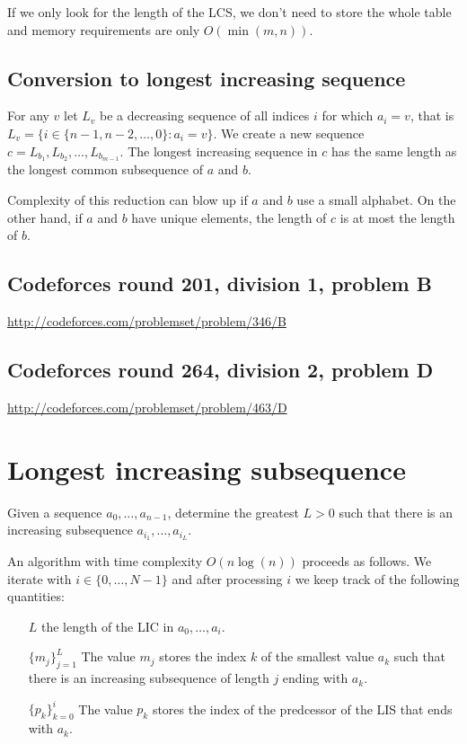 \documentclass[a4paper, twoside,openany]{book}
\newcounter{problem}\setcounter{problem}{0}
\newcommand{\insertcode}[2]{\begin{itemize}\item[]\end{itemize}} %
\begin{document}
\insertcode{"codes/longest_common_subsequence.cpp"}{A dynanamic programming approach to the LCS problem with LCS reconstruction.}

If we only look for the length of the LCS, we don't need to store the whole table and memory requirements are only $O(\min(m,n))$.

\insertcode{"codes/longest_common_subsequence_length.cpp"}{A dynanamic programming approac to find the length of the LCS.}

\subsection{Conversion to longest increasing sequence}
For any $v$ let $L_v$  be a decreasing sequence of all indices $i$ for which $a_i = v$, that is $L_v= \{ i\in \{n-1, n-2, \ldots, 0\} : a_i = v \}$. We create a new sequence $c = L_{b_1}, L_{b_2}, \ldots, L_{b_{m-1}}$. The longest increasing sequence in $c$ has the same length as the longest common subsequence of $a$ and $b$.

Complexity of this reduction can blow up if $a$ and $b$ use a small alphabet. On the other hand, if $a$ and $b$ have unique elements, the length of $c$ is at most the length of $b$.

\subsection{Codeforces round 201, division 1, problem B}
\url{http://codeforces.com/problemset/problem/346/B}

\subsection{Codeforces round 264, division 2, problem D}
\url{http://codeforces.com/problemset/problem/463/D}

\section{Longest increasing subsequence}
Given a sequence $a_0, \ldots, a_{n-1}$, determine the greatest $L>0$ such that there is an  increasing subsequence $a_{i_1}, \ldots, a_{i_L}$.

An algorithm with time complexity $O(n \log(n))$ proceeds as follows. We iterate with $i\in \{0, \ldots, N-1\}$ and after processing $i$ we keep track of the following quantities:
\begin{enumerate}
\item[$L$] the length of the LIC in $a_0, \ldots, a_{i}$.
\item[$\{ m_j \}_{j=1}^L$] The value $m_j$ stores the index $k$ of the smallest value $a_k$ such that there is an increasing subsequence of length $j$ ending with $a_k$. 
\item[$\{ p_k \}_{k=0}^i$] The value $p_k$ stores the index of the predcessor of the LIS that ends with $a_k$.
\end{enumerate}
\end{document}
